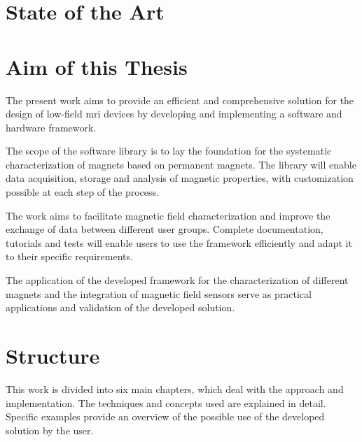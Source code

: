 \hypertarget{state-of-the-art}{%
\section{State of the Art}\label{state-of-the-art}}

\hypertarget{aim-of-this-thesis}{%
\section{Aim of this Thesis}\label{aim-of-this-thesis}}

The present work aims to provide an efficient and comprehensive solution
for the design of low-field \gls{mri} devices by developing and
implementing a software and hardware framework.

The scope of the software library is to lay the foundation for the
systematic characterization of magnets based on permanent magnets. The
library will enable data acquisition, storage and analysis of magnetic
properties, with customization possible at each step of the process.

The work aims to facilitate magnetic field characterization and improve
the exchange of data between different user groups. Complete
documentation, tutorials and tests will enable users to use the
framework efficiently and adapt it to their specific requirements.

The application of the developed framework for the characterization of
different magnets and the integration of magnetic field sensors serve as
practical applications and validation of the developed solution.

\hypertarget{structure}{%
\section{Structure}\label{structure}}

This work is divided into six main chapters, which deal with the
approach and implementation. The techniques and concepts used are
explained in detail. Specific examples provide an overview of the
possible use of the developed solution by the user.


